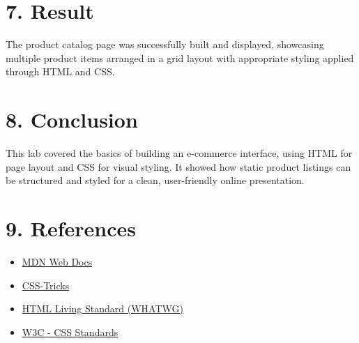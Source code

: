 \documentclass[a4paper,12pt]{article}
\begin{document}
\section*{7. Result}
The product catalog page was successfully built and displayed, showcasing multiple product items arranged in a grid layout with appropriate styling applied through HTML and CSS.

\section*{8. Conclusion}
This lab covered the basics of building an e-commerce interface, using HTML for page layout and CSS for visual styling. It showed how static product listings can be structured and styled for a clean, user-friendly online presentation.


\section*{9. References}
\begin{itemize}
  \item \href{https://developer.mozilla.org/en-US/docs/Web}{MDN Web Docs}
  \item \href{https://css-tricks.com}{CSS-Tricks}
  \item \href{https://html.spec.whatwg.org/}{HTML Living Standard (WHATWG)}
  \item \href{https://www.w3.org/TR/CSS/#css}{W3C - CSS Standards}
\end{itemize}
\end{document}
